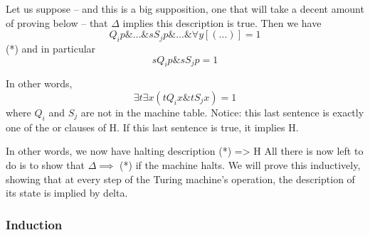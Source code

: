 Let us suppose -- and this is a big supposition, one that will take a decent amount of proving below -- that $\Delta$ implies this description is true. Then we have 
\[Q_ip \& \dots \& sS_jp \& \dots \& \forall y [(...)] = 1 		\]	(*)
and in particular
\[sQ_ip \& sS_jp = 1\]

In other words, 
\[\exists t \exists x (tQ_ix \& tS_jx) = 1\]
where $Q_i$ and $S_j$ are not in the machine table.
Notice: this last sentence is exactly one of the or clauses of H. If this last sentence is true, it implies H.

In other words, we now have 
halting description (*) => H
All there is now left to do is to show that $\Delta \implies$ (*) if the machine halts.
We will prove this inductively, showing that at every step of the Turing machine's operation, the description of its state is implied by delta.


\subsubsection{Induction}
